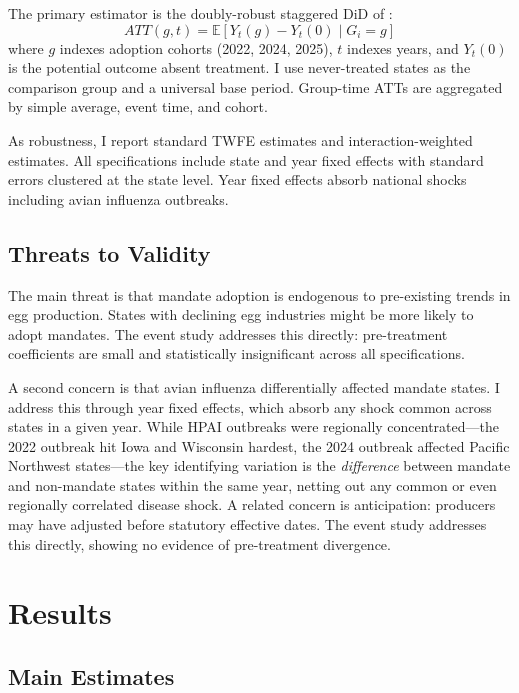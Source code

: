 \documentclass[12pt]{article}
\newcommand{\E}{\mathbb{E}}
\begin{document}
The primary estimator is the doubly-robust staggered DiD of \citet{callaway2021difference}:
\begin{equation}
ATT(g,t) = \E\left[Y_t(g) - Y_t(0) \mid G_i = g\right]
\end{equation}
where $g$ indexes adoption cohorts (2022, 2024, 2025), $t$ indexes years, and $Y_t(0)$ is the potential outcome absent treatment. I use never-treated states as the comparison group and a universal base period. Group-time ATTs are aggregated by simple average, event time, and cohort.

As robustness, I report standard TWFE estimates and \citet{sun2021estimating} interaction-weighted estimates. All specifications include state and year fixed effects with standard errors clustered at the state level. Year fixed effects absorb national shocks including avian influenza outbreaks.

\subsection{Threats to Validity}

The main threat is that mandate adoption is endogenous to pre-existing trends in egg production. States with declining egg industries might be more likely to adopt mandates. The event study addresses this directly: pre-treatment coefficients are small and statistically insignificant across all specifications.

A second concern is that avian influenza differentially affected mandate states. I address this through year fixed effects, which absorb any shock common across states in a given year. While HPAI outbreaks were regionally concentrated---the 2022 outbreak hit Iowa and Wisconsin hardest, the 2024 outbreak affected Pacific Northwest states---the key identifying variation is the \textit{difference} between mandate and non-mandate states within the same year, netting out any common or even regionally correlated disease shock. A related concern is anticipation: producers may have adjusted before statutory effective dates. The event study addresses this directly, showing no evidence of pre-treatment divergence.


\section{Results}

\subsection{Main Estimates}
\end{document}
